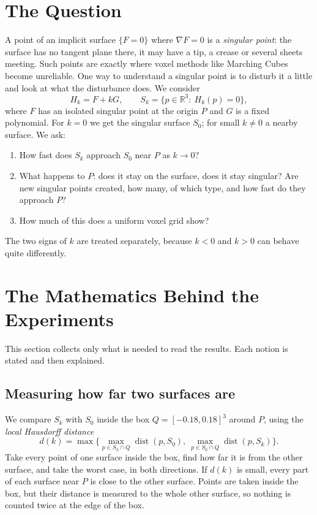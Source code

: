 \documentclass[12pt, a4paper]{article}
\theoremstyle{plain}
\theoremstyle{definition}
\theoremstyle{remark}
\theoremstyle{definition}
\begin{document}
\section{The Question}
\label{sec:r-question}

A point of an implicit surface $\{F=0\}$ where $\nabla F=0$ is a \emph{singular
point}: the surface has no tangent plane there, it may have a tip, a crease or
several sheets meeting. Such points are exactly where voxel methods like Marching
Cubes \cite{lorensen1998marching} become unreliable. One way to understand a singular point is to disturb
it a little and look at what the disturbance does. We consider
\[
H_k=F+kG,\qquad S_k=\{p\in\mathbb{R}^3:\ H_k(p)=0\},
\]
where $F$ has an isolated singular point at the origin $P$ and $G$ is a fixed
polynomial. For $k=0$ we get the singular surface $S_0$; for small $k\neq0$ a
nearby surface. We ask:
\begin{enumerate}
    \item How fast does $S_k$ approach $S_0$ near $P$ as $k\to0$?
    \item What happens to $P$: does it stay on the surface, does it stay singular?
          Are new singular points created, how many, of which type, and how fast
          do they approach $P$?
    \item How much of this does a uniform voxel grid show?
\end{enumerate}
The two signs of $k$ are treated separately, because $k<0$ and $k>0$ can behave
quite differently.

\section{The Mathematics Behind the Experiments}
\label{sec:r-theory}

This section collects only what is needed to read the results. Each notion is
stated and then explained.

\subsection{Measuring how far two surfaces are}

We compare $S_k$ with $S_0$ inside the box $Q=[-0.18,0.18]^3$ around $P$, using
the \emph{local Hausdorff distance}
\[
d(k)=\max\Big\{\max_{p\in S_k\cap Q}\operatorname{dist}(p,S_0),\ \max_{p\in S_0\cap Q}\operatorname{dist}(p,S_k)\Big\}.
\]
Take every point of one surface inside the box, find how far it is from
the other surface, and take the worst case, in both directions. If $d(k)$ is
small, every part of each surface near $P$ is close to the other surface.
Points are taken inside the box, but their distance is measured to the whole
other surface, so nothing is counted twice at the edge of the box.
\end{document}
